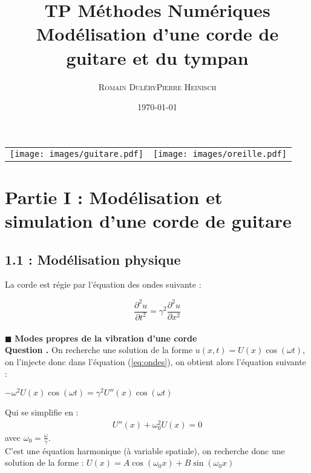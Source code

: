 \documentclass[a4,12pt]{article}
\title{\textbf{TP Méthodes Numériques \\ Modélisation d'une corde de guitare et du tympan}}
\author{
	\begin{tabular}{cc}
	  \textsc{Romain Duléry} & \textsc{Pierre Heinisch} \\
	\end{tabular}}
\date{\small \today}
\newcounter{Nbquestion}
\newcommand*\question{%
  \stepcounter{Nbquestion}%
  \textbf{Question \theNbquestion. }}
\begin{document}
	  \maketitle

	  \begin{center}
	    \begin{tabular}{cc} 
	      \texttt{[image: images/guitare.pdf]} & 
	      \texttt{[image: images/oreille.pdf]} 
	    \end{tabular}
	  \end{center}

	  \section*{Partie I : Modélisation et simulation d'une corde de guitare}
	  \subsection*{1.1 : Modélisation physique}

	  La corde est régie par l'équation des ondes suivante :

	  \begin{equation}
	    \frac{\partial ^2u}{\partial t^2}=\gamma^2\frac{\partial ^2u}{\partial x^2}
	    \label{eq:ondes}
	  \end{equation}\\

	  \indent $\blacksquare$ \textbf{Modes propres de la vibration d'une corde}\\


	  \question On recherche une solution de la forme $u(x,t)=U(x)\cos(\omega t)$, on l'injecte donc dans l'équation (\ref{eq:ondes}), on obtient alors l'équation suivante :\\
	  \begin{center}
	    $-\omega^2  U(x)\cos(\omega t) = \gamma^2 U''(x) \cos(\omega t)$
	  \end{center}
	  Qui se simplifie en :
	  \begin{eqnarray}
	    U''(x) + \omega_0^2 U(x) = 0
	  \end{eqnarray}
	  avec $\omega_0 = \frac{\omega}{\gamma}$.\\

	  C'est une équation harmonique (à variable spatiale), on recherche donc une solution de la forme : $U(x) = A \cos(\omega_0 x) + B \sin(\omega_0 x)$\\
\end{document}
